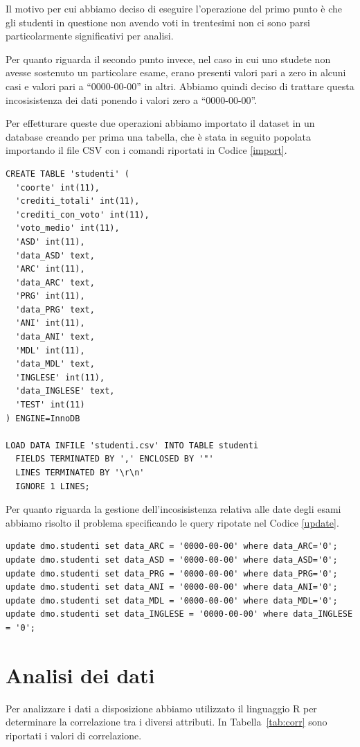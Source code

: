 \documentclass[12pt]{article}
\begin{document}
Il motivo per cui abbiamo deciso di eseguire l'operazione del primo punto è che gli studenti in questione non avendo voti in trentesimi non ci sono parsi particolarmente significativi per analisi.

Per quanto riguarda il secondo punto invece, nel caso in cui uno stu\-dete non avesse sostenuto un particolare esame, erano presenti valori pari a zero in alcuni casi e valori pari a ``0000-00-00'' in altri.
Abbiamo quindi deciso di trattare questa incosisistenza dei dati ponendo i valori zero a ``0000-00-00''.

Per effetturare queste due operazioni abbiamo importato il dataset in un database creando per prima una tabella, che è stata in seguito popolata importando il file CSV con i comandi riportati in Codice \ref{import}.
\begin{lstlisting}[caption={Creazione della table}, style=sql, label={import}, captionpos=b]
CREATE TABLE 'studenti' (
  'coorte' int(11),
  'crediti_totali' int(11),
  'crediti_con_voto' int(11),
  'voto_medio' int(11),
  'ASD' int(11),
  'data_ASD' text,
  'ARC' int(11),
  'data_ARC' text,
  'PRG' int(11),
  'data_PRG' text,
  'ANI' int(11),
  'data_ANI' text,
  'MDL' int(11),
  'data_MDL' text,
  'INGLESE' int(11),
  'data_INGLESE' text,
  'TEST' int(11)
) ENGINE=InnoDB

LOAD DATA INFILE 'studenti.csv' INTO TABLE studenti
  FIELDS TERMINATED BY ',' ENCLOSED BY '"'
  LINES TERMINATED BY '\r\n'
  IGNORE 1 LINES;
\end{lstlisting}

Per quanto riguarda la gestione dell'incosisistenza relativa alle date degli esami abbiamo risolto il problema specificando le query ripotate nel Codice \ref{update}.
\begin{lstlisting}[caption={Update della tabella},style=sql, label={update},captionpos=b]
update dmo.studenti set data_ARC = '0000-00-00' where data_ARC='0'; 
update dmo.studenti set data_ASD = '0000-00-00' where data_ASD='0'; 
update dmo.studenti set data_PRG = '0000-00-00' where data_PRG='0'; 
update dmo.studenti set data_ANI = '0000-00-00' where data_ANI='0'; 
update dmo.studenti set data_MDL = '0000-00-00' where data_MDL='0';
update dmo.studenti set data_INGLESE = '0000-00-00' where data_INGLESE = '0';
\end{lstlisting}
\newpage
\section{Analisi dei dati}
Per analizzare i dati a disposizione abbiamo utilizzato il linguaggio R per determinare la correlazione tra i diversi attributi.
In Tabella~\ref{tab:corr} sono riportati i valori di correlazione.
\end{document}
